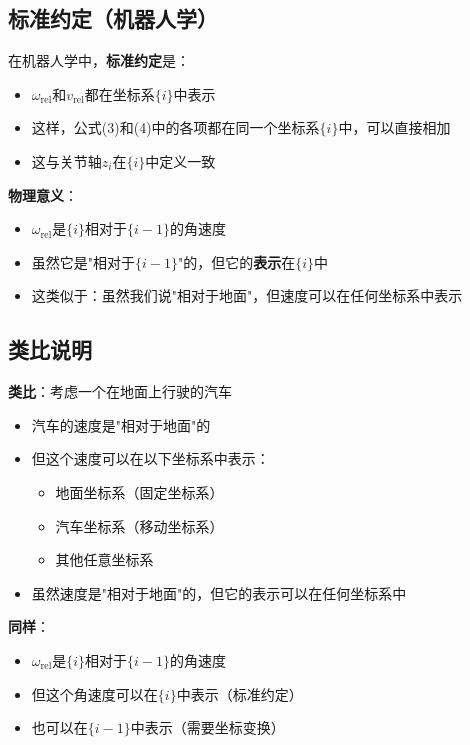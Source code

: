 \documentclass[12pt,a4paper]{article}
\begin{document}
\subsection{标准约定（机器人学）}

在机器人学中，\textbf{标准约定}是：
\begin{itemize}
\item $\omega_{\text{rel}}$和$v_{\text{rel}}$都在坐标系$\{i\}$中表示
\item 这样，公式(3)和(4)中的各项都在同一个坐标系$\{i\}$中，可以直接相加
\item 这与关节轴$z_i$在$\{i\}$中定义一致
\end{itemize}

\textbf{物理意义}：
\begin{itemize}
\item $\omega_{\text{rel}}$是$\{i\}$相对于$\{i-1\}$的角速度
\item 虽然它是"相对于$\{i-1\}$"的，但它的\textbf{表示}在$\{i\}$中
\item 这类似于：虽然我们说"相对于地面"，但速度可以在任何坐标系中表示
\end{itemize}

\subsection{类比说明}

\textbf{类比}：考虑一个在地面上行驶的汽车
\begin{itemize}
\item 汽车的速度是"相对于地面"的
\item 但这个速度可以在以下坐标系中表示：
\begin{itemize}
\item 地面坐标系（固定坐标系）
\item 汽车坐标系（移动坐标系）
\item 其他任意坐标系
\end{itemize}
\item 虽然速度是"相对于地面"的，但它的表示可以在任何坐标系中
\end{itemize}

\textbf{同样}：
\begin{itemize}
\item $\omega_{\text{rel}}$是$\{i\}$相对于$\{i-1\}$的角速度
\item 但这个角速度可以在$\{i\}$中表示（标准约定）
\item 也可以在$\{i-1\}$中表示（需要坐标变换）
\end{itemize}
\end{document}
